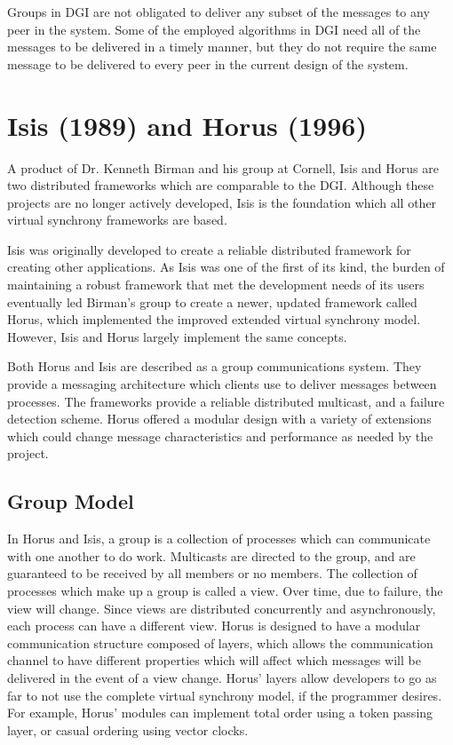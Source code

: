 Groups in DGI are not obligated to deliver any subset of the messages to any peer in the system. Some of the employed algorithms in DGI need all of the messages to be delivered in a timely manner, but they do not require the same message to be delivered to every peer in the current design of the system.

\section{Isis (1989) and Horus (1996)}

A product of Dr. Kenneth Birman and his group at Cornell, Isis \cite{ISISTOOLKIT} and Horus \cite{HORUSTOOLKIT} are two distributed frameworks which are comparable to the DGI. Although these projects are no longer actively developed, Isis is the foundation which all other virtual synchrony frameworks are based.

Isis was originally developed to create a reliable distributed framework for creating other applications. As Isis was one of the first of its kind, the burden of maintaining a robust framework that met the development needs of its users eventually led Birman's group to create a newer, updated framework called Horus, which implemented the improved extended virtual synchrony model. However, Isis and Horus largely implement the same concepts.

Both Horus and Isis are described as a group communications system. They provide a messaging architecture which clients use to deliver messages between processes. The frameworks provide a reliable distributed multicast, and a failure detection scheme. Horus offered a modular design with a variety of extensions which could change message characteristics and performance as needed by the project.

\subsection{Group Model}
In Horus and Isis, a group is a collection of processes which can communicate with one another to do work. Multicasts are directed to the group, and are guaranteed to be received by all members or no members. The collection of processes which make up a group is called a view.
Over time, due to failure, the view will change. Since views are distributed concurrently and asynchronously, each process can have a different view. Horus is designed to have a modular communication structure composed of layers, which allows the communication channel to have different properties which will affect which messages will be delivered in the event of a view change. Horus' layers allow developers to go as far to not use the complete virtual synchrony model, if the programmer desires. For example, Horus' modules can implement total order using a token passing layer, or casual ordering using vector clocks.

